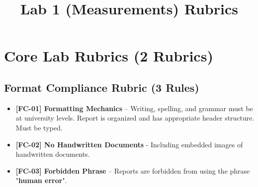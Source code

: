 \documentclass{article}
\begin{document}
\pagestyle{empty}

\title{Lab 1 (Measurements) Rubrics}

\section*{Core Lab Rubrics (2 Rubrics)}

\subsection*{Format Compliance Rubric (3 Rules)}
\begin{itemize}
\item \textbf{ [FC-01] Formatting Mechanics } – Writing, spelling, and grammar must be at university levels. Report is organized and has appropriate header structure. Must be typed.
\item \textbf{ [FC-02] No Handwritten Documents } - Including embedded images of handwritten documents.
\item \textbf{ [FC-03] Forbidden Phrase } – Reports are forbidden from using the phrase "\textbf{human error}". 
\end{itemize}
\end{document}
